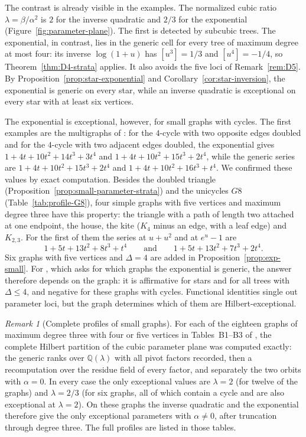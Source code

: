 \documentclass[reqno]{article}
\theoremstyle{plain} %
\theoremstyle{definition}
\theoremstyle{remark}
\newtheorem{remark}[theorem]{\sc Remark}
\numberwithin{equation}{section}
\begin{document}
The contrast is already visible in the examples. The normalized cubic
ratio $\lambda=\beta/\alpha^2$ is $2$ for the inverse quadratic and
$2/3$ for the exponential (Figure~\ref{fig:parameter-plane}). The first
is detected by subcubic trees. The exponential, in contrast, lies in the
generic cell for every tree of maximum degree at most four: its inverse
$\log(1+u)$ has $[u^3]=1/3$ and $[u^4]=-1/4$, so
Theorem~\ref{thm:D4-strata} applies. It also avoids the five loci of
Remark~\ref{rem:D5}. By Proposition~\ref{prop:star-exponential} and
Corollary~\ref{cor:star-inversion}, the exponential is generic on every
star, while an inverse quadratic is exceptional on every star with at
least six vertices.

The exponential is exceptional, however, for small graphs with cycles.
The first examples are the multigraphs of \cite[Example~2]{NSh}: for the
$4$-cycle with two opposite edges doubled and for the $4$-cycle with two
adjacent edges doubled, the exponential gives
$1+4t+10t^2+14t^3+3t^4$ and $1+4t+10t^2+15t^3+2t^4$, while the generic
series are $1+4t+10t^2+15t^3+2t^4$ and $1+4t+10t^2+16t^3+t^4$. We
confirmed these values by exact computation.
Besides the doubled triangle (Proposition~\ref{prop:small-parameter-strata})
and the unicycles $G8$ (Table~\ref{tab:profile-G8}), four simple graphs
with five vertices and maximum degree three have this property: the
triangle with a path of length two attached at one endpoint, the house,
the kite ($K_4$ minus an edge, with a leaf edge) and $K_{2,3}$. For the
first of them the series at $u+u^2$ and at $e^u-1$ are
\[
1+5t+13t^2+8t^3+t^4\qquad\text{and}\qquad 1+5t+13t^2+7t^3+2t^4.
\]
Six graphs with five vertices and $\Delta=4$ are added in
Proposition~\ref{prop:exp-small}.
For \cite[Problem~3]{NSh}, which asks for which graphs the exponential
is generic, the answer therefore depends on the graph: it is affirmative
for stars and for all trees with $\Delta\le4$, and negative for these
graphs with cycles. Functional
identities single out parameter loci, but the graph determines which of
them are Hilbert-exceptional.

\begin{remark}[Complete profiles of small graphs]
\label{rem:small-complete-profiles}
For each of the eighteen graphs of maximum degree three with four or
five vertices in Tables~B1--B3 of \cite[\texttt{tables/}]{Cert}, the complete
Hilbert partition of the cubic parameter plane was computed exactly: the
generic ranks over $\mathbb{Q}(\lambda)$ with all pivot factors recorded,
then a recomputation over the residue field of every factor, and
separately the two orbits with $\alpha=0$. In every case the only
exceptional values are $\lambda=2$ (for twelve of the graphs) and
$\lambda=2/3$ (for six graphs, all of which contain a cycle and are also
exceptional at $\lambda=2$). On these graphs the inverse quadratic and the
exponential therefore give the only exceptional parameters with
$\alpha\ne0$, after truncation through degree three. The full profiles
are listed in those tables.
\end{remark}
\end{document}
